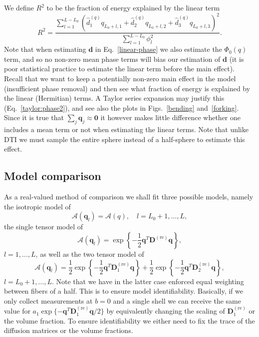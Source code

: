 \documentclass[authoryear,preprint,12pt]{elsarticle}
\newcommand{\re}{\text{re}}
\newcommand{\bq}{\mathbf{q}}
\newcommand{\bD}{\mathbf{D}}
\newcommand{\q}{\mathbf{q}}
\newcommand{\cA}{\mathcal{A}}
\newcommand{\bld}[1]{\mathbf{#1}}
\begin{document}
We define $R^2$ to be the fraction of energy explained by the linear
term
\begin{equation}
  R^2 = \frac{\sum_{l=1}^{L-L_0} \left(\hat{d}_1^{(q)}q_{L_0+l,1}
    + \hat{d}_2^{(q)}q_{L_0+l,2} + \hat{d}_3^{(q)}q_{L_0+l,3}\right)^2}
  {\sum_{l=1}^{L-L_0}\phi_l^2}.
\end{equation}
Note that when estimating $\bld{d}$ in Eq.~\eqref{linear-phase} we
also estimate the $\Phi_0(q)$ term, and so no non-zero mean phase
terms will bias our estimation of $\bld{d}$ (it is poor statistical
practice to estimate the linear term before the main effect).  Recall
that we want to keep a potentially non-zero main effect in the model
(insufficient phase removal) and then see what fraction of energy is
explained by the linear (Hermitian) terms.  A Taylor series expansion
may justify this (Eq.~\eqref{taylor:phase2}), and see also the plots
in Figs.~\ref{bending} and~\ref{forking}.  Since it is true that
$\sum_j\q_j\approx\bld{0}$ it however makes little difference whether
one includes a mean term or not when estimating the linear terms.
Note that unlike DTI we must sample the entire sphere instead of a
half-sphere to estimate this effect.

\subsection{Model comparison}

As a real-valued method of comparison we shall fit three possible
models, namely the isotropic model of
\begin{equation}\label{isotropic}
  \cA(\bq_l) = \cA(q), \quad l=L_0+1, \dots, L,
\end{equation}
the single tensor model of
\begin{equation}\label{singletensor}
  \cA(\bq_l) = \exp\left\{-\frac{1}{2}\q^T\bD^{(\re)}\q\right\}, 
\end{equation}
$l=1,\dots,L$, as well as the two tensor model of 
\begin{equation}\label{doubletensor}
  \cA(\bq_l) = \frac{1}{2}\exp\left\{-\frac{1}{2} \q^T \bD^{(\re)}_1
  \q\right\} + \frac{1}{2}\exp\left\{-\frac{1}{2} \q^T \bD^{(\re)}_2
  \q\right\},
\end{equation}
$l=L_0+1,\dots,L$.  Note that we have in the latter case enforced
equal weighting between fibers of a half.  This is to ensure model
identifiability.  Basically, if we only collect measurements at $b=0$
and a single shell we can receive the same value for
$a_1\exp\{-{\q}^T\bD^{(\re)}_1{\q}/2\}$ by equivalently changing the
scaling of $\bD^{(\re)}_1$ or the volume fraction.  To ensure
identifiability we either need to fix the trace of the diffusion
matrices or the volume fractions.
\end{document}
